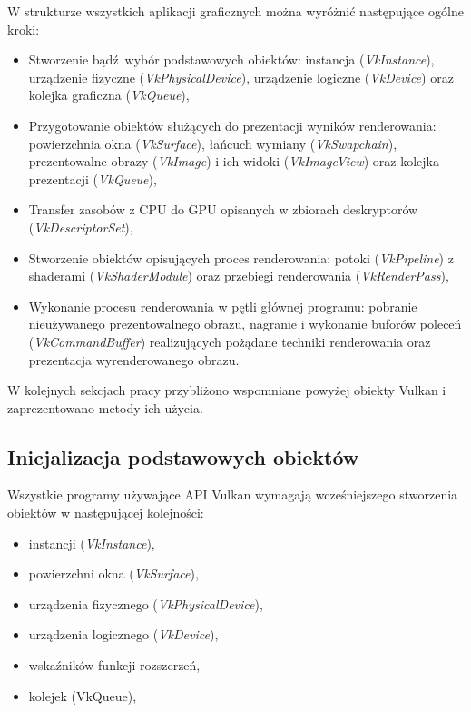W strukturze wszystkich aplikacji graficznych można wyróżnić następujące ogólne kroki:
\begin{itemize}
	\item Stworzenie bądź wybór podstawowych obiektów: instancja (\textit{VkInstance}), urządzenie fizyczne (\textit{VkPhysicalDevice}), urządzenie logiczne (\textit{VkDevice}) oraz kolejka graficzna (\textit{VkQueue}),
	\item Przygotowanie obiektów służących do prezentacji wyników renderowania: powierzchnia okna (\textit{VkSurface}), łańcuch wymiany (\textit{VkSwapchain}), prezentowalne obrazy (\textit{VkImage}) i ich widoki (\textit{VkImageView}) oraz kolejka prezentacji (\textit{VkQueue}),
	\item Transfer zasobów z CPU do GPU opisanych w zbiorach deskryptorów (\textit{VkDescriptorSet}),
	\item Stworzenie obiektów opisujących proces renderowania: potoki (\textit{VkPipeline}) z shaderami (\textit{VkShaderModule}) oraz przebiegi renderowania (\textit{VkRenderPass}),
	\item Wykonanie procesu renderowania w pętli głównej programu: pobranie nieużywanego prezentowalnego obrazu, nagranie i wykonanie buforów poleceń (\textit{VkCommandBuffer}) realizujących pożądane techniki renderowania oraz prezentacja wyrenderowanego obrazu.
\end{itemize}

W kolejnych sekcjach pracy przybliżono wspomniane powyżej obiekty Vulkan i zaprezentowano metody ich użycia.


\subsection{Inicjalizacja podstawowych obiektów}

Wszystkie programy używające API Vulkan wymagają wcześniejszego stworzenia obiektów w następującej kolejności:
\begin{itemize}
	\item instancji (\textit{VkInstance}),
	\item powierzchni okna (\textit{VkSurface}),
	\item urządzenia fizycznego (\textit{VkPhysicalDevice}),
	\item urządzenia logicznego (\textit{VkDevice}),
	\item wskaźników funkcji rozszerzeń,
	\item kolejek (VkQueue),
\end{itemize}

